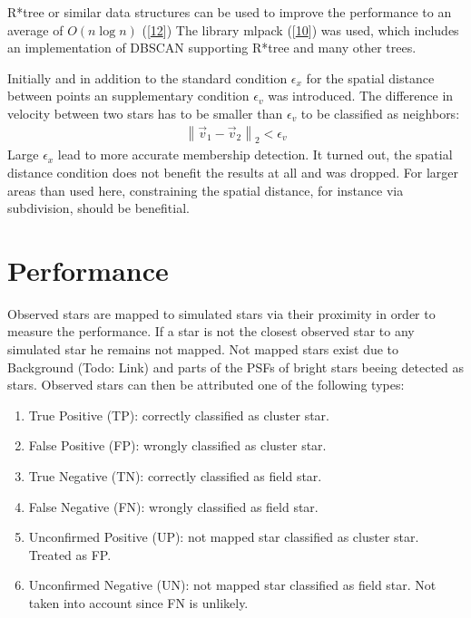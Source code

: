 \documentclass[letterpaper,10pt,english]{sphinxmanual}
\begin{document}
\sphinxAtStartPar
R*\sphinxhyphen{}tree or similar data structures can be used to improve the performance to an average of \(O(n\log{n})\) ({[}\hyperlink{cite.NBodySimulation/Appendix:id33}{12}{]})
The library mlpack ({[}\hyperlink{cite.NBodySimulation/Appendix:id34}{10}{]}) was used, which includes an implementation of DBSCAN supporting R*\sphinxhyphen{}tree and many other trees.

\sphinxAtStartPar
Initially and in addition to the standard condition \(\epsilon_{x}\) for the spatial distance between points an supplementary condition \(\epsilon_{v}\) was introduced.
The difference in velocity between two stars has to be smaller than \(\epsilon_{v}\) to be classified as neighbors:
\begin{equation*}
\begin{split}\left \|\vec{v}_{1}-\vec{v}_{2}  \right \|_{2}< \epsilon_{v}\end{split}
\end{equation*}
\sphinxAtStartPar
Large \(\epsilon_{x}\) lead to more accurate membership detection. It turned out, the spatial distance condition does not benefit the results at all and was dropped.
For larger areas than used here, constraining the spatial distance, for instance via subdivision, should be benefitial.


\section{Performance}
\label{\detokenize{NBodySimulation/Clustering:performance}}
\sphinxAtStartPar
Observed stars are mapped to simulated stars via their proximity in order to measure the performance. If a star is not the closest observed star to any simulated star he remains not mapped.
Not mapped stars exist due to Background (Todo: Link) and parts of the PSFs of bright stars beeing detected as stars. Observed stars can then be attributed one of the following types:
\begin{enumerate}
%
\item {} 
\sphinxAtStartPar
True Positive (TP): correctly classified as cluster star.

\item {} 
\sphinxAtStartPar
False Positive (FP): wrongly classified as cluster star.

\item {} 
\sphinxAtStartPar
True Negative (TN): correctly classified as field star.

\item {} 
\sphinxAtStartPar
False Negative (FN): wrongly classified as field star.

\item {} 
\sphinxAtStartPar
Unconfirmed Positive (UP): not mapped star classified as cluster star. Treated as FP.

\item {} 
\sphinxAtStartPar
Unconfirmed Negative (UN): not mapped star classified as field star. Not taken into account since FN is unlikely.

\end{enumerate}
\end{document}
